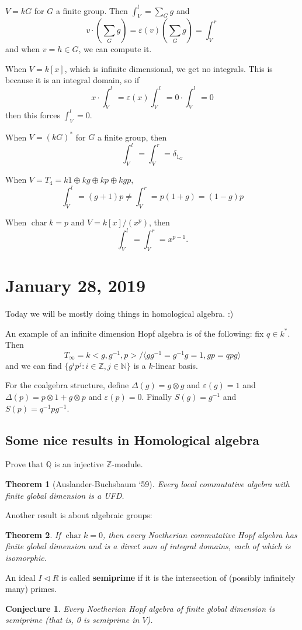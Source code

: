 \documentclass[12pt]{article}
\theoremstyle{break}
\theoremstyle{nonumberbreak}
\theoremstyle{changebreak}
\newtheorem{thm}{Theorem}[subsection]
\theoremstyle{break}
\theoremstyle{nonumberbreak}
\theoremstyle{nonumberplain}
\newtheorem{conj}{Conjecture}
\theoremstyle{change}
\newcommand*{\Z}{
\mathbb{Z}
}
\newcommand*{\N}{
\mathbb{N}
}
\newcommand*{\Q}{
\mathbb{Q}
}
\DeclareMathOperator{\ch}{char}
\begin{document}
\begin{ex}
	$V=kG$ for $G$ a finite group. Then $\int_V^l=\sum_G g$ and
	\[v\cdot(\sum_G g)=\varepsilon(v)(\sum_G g)=\int_V^r\]
	and when $v=h\in G$, we can compute it.
\end{ex}
\begin{ex}
	When $V=k[x]$, which is infinite dimensional, we get no integrals. This is because it is an 
	integral domain, so if
	\[x\cdot\int_V^l=\varepsilon(x)\int_V^l=0\cdot\int_V^l=0\]
	then this forces $\int_V^l=0$.
\end{ex}
\begin{ex}
	When $V=(kG)^*$ for $G$ a finite group, then 
	\[\int_V^l=\int_V^r=\delta_{1_G}\]
\end{ex}
\begin{ex}
	When $V=T_4=k1\oplus kg\oplus kp\oplus kgp$,
	\[\int_V^l=(g+1)p\ne\int_V^r=p(1+g)=(1-g)p\]
\end{ex}
\begin{ex}
	When $\ch k=p$ and $V=k[x]/(x^p)$, then 
	\[\int_V^l=\int_V^r=x^{p-1}.\]
\end{ex}

\section{January 28, 2019}
Today we will be mostly doing things in homological algebra. :)
\begin{ex}
	An example of an infinite dimension Hopf algebra is of the following: fix $q\in k^*$. Then 
	\[T_\infty=k<g, g^{-1}, p>/\langle gg^{-1}=g^{-1}g=1, gp=qpg\rangle\]
	and we can find $\{g^ip^j:i\in\Z, j\in\N\}$ is a $k$-linear basis.

	For the coalgebra structure, define $\Delta(g)=g\otimes g$ and $\varepsilon(g)=1$ and 
	$\Delta(p)=p\otimes 1+g\otimes p$ and $\varepsilon(p)=0$. Finally $S(g)=g^{-1}$ and $S(p)=q^{-1}pg^{-1}$.
\end{ex}

\subsection{Some nice results in Homological algebra}
\begin{prob}
	Prove that $\Q$ is an injective $\Z$-module.
\end{prob}
\begin{thm}[Auslander-Buchsbaum `59]
	Every local commutative algebra with finite global dimension is a UFD.
\end{thm}
Another result is about algebraic groups:
\begin{thm}
	If $\ch k=0$, then every Noetherian commutative Hopf algebra has finite global dimension
	and is a direct sum of integral domains, each of which is isomorphic.
\end{thm}
\begin{defn}[Semiprime]
	An ideal $I\lhd R$ is called \textbf{semiprime} if it is the intersection of (possibly infinitely many) primes.
\end{defn}
\begin{conj}
	Every Noetherian Hopf algebra of finite global dimension is semiprime (that is, 0 is semiprime in $V$).
\end{conj}
\end{document}
